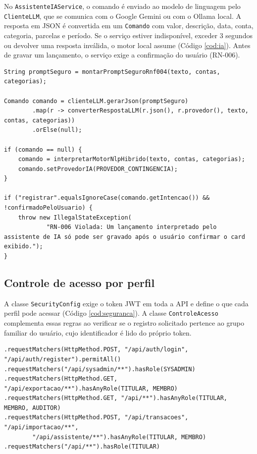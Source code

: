 \documentclass[12pt,oneside,a4paper,article]{abntex2}
\begin{document}
No \texttt{AssistenteIAService}, o comando é enviado ao modelo de linguagem pelo \texttt{ClienteLLM}, que se comunica com o Google Gemini ou com o Ollama local. A resposta em JSON é convertida em um \texttt{Comando} com valor, descrição, data, conta, categoria, parcelas e período. Se o serviço estiver indisponível, exceder 3 segundos ou devolver uma resposta inválida, o motor local assume (Código \ref{cod:ia}). Antes de gravar um lançamento, o serviço exige a confirmação do usuário (RN-006).

\begin{lstlisting}[caption={Interpretação pelo modelo de linguagem, contingência e RN-006 (AssistenteIAService.java)},label={cod:ia}]
String promptSeguro = montarPromptSeguroRnf004(texto, contas, categorias);

Comando comando = clienteLLM.gerarJson(promptSeguro)
        .map(r -> converterRespostaLLM(r.json(), r.provedor(), texto, contas, categorias))
        .orElse(null);

if (comando == null) {
    comando = interpretarMotorNlpHibrido(texto, contas, categorias);
    comando.setProvedorIA(PROVEDOR_CONTINGENCIA);
}

if ("registrar".equalsIgnoreCase(comando.getIntencao()) && !confirmadoPeloUsuario) {
    throw new IllegalStateException(
            "RN-006 Violada: Um lançamento interpretado pelo assistente de IA só pode ser gravado após o usuário confirmar o card exibido.");
}
\end{lstlisting}

\subsection{Controle de acesso por perfil}

A classe \texttt{SecurityConfig} exige o token JWT em toda a API e define o que cada perfil pode acessar (Código \ref{cod:seguranca}). A classe \texttt{ControleAcesso} complementa essas regras ao verificar se o registro solicitado pertence ao grupo familiar do usuário, cujo identificador é lido do próprio token.

\begin{lstlisting}[caption={Regras de acesso por perfil (SecurityConfig.java)},label={cod:seguranca}]
.requestMatchers(HttpMethod.POST, "/api/auth/login", "/api/auth/register").permitAll()
.requestMatchers("/api/sysadmin/**").hasRole(SYSADMIN)
.requestMatchers(HttpMethod.GET, "/api/exportacao/**").hasAnyRole(TITULAR, MEMBRO)
.requestMatchers(HttpMethod.GET, "/api/**").hasAnyRole(TITULAR, MEMBRO, AUDITOR)
.requestMatchers(HttpMethod.POST, "/api/transacoes", "/api/importacao/**",
        "/api/assistente/**").hasAnyRole(TITULAR, MEMBRO)
.requestMatchers("/api/**").hasRole(TITULAR)
\end{lstlisting}
\end{document}
